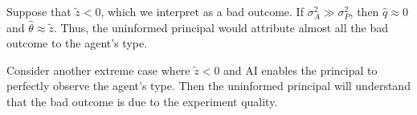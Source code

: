 \documentclass{article}
\begin{document}
Suppose that $\tilde{z} < 0$, which we interpret as a bad outcome. If $\sigma_A^2 \gg \sigma_P^2$, then $\hat{q} \approx 0$ and $\hat{\theta} \approx \tilde{z}$. Thus, the uninformed principal would attribute almost all the bad outcome to the agent's type.

Consider another extreme case where $\tilde{z} < 0$ and AI enables the principal to perfectly observe the agent's type. Then the uninformed principal will understand that the bad outcome is due to the experiment quality.







% 
% 


\end{document}
